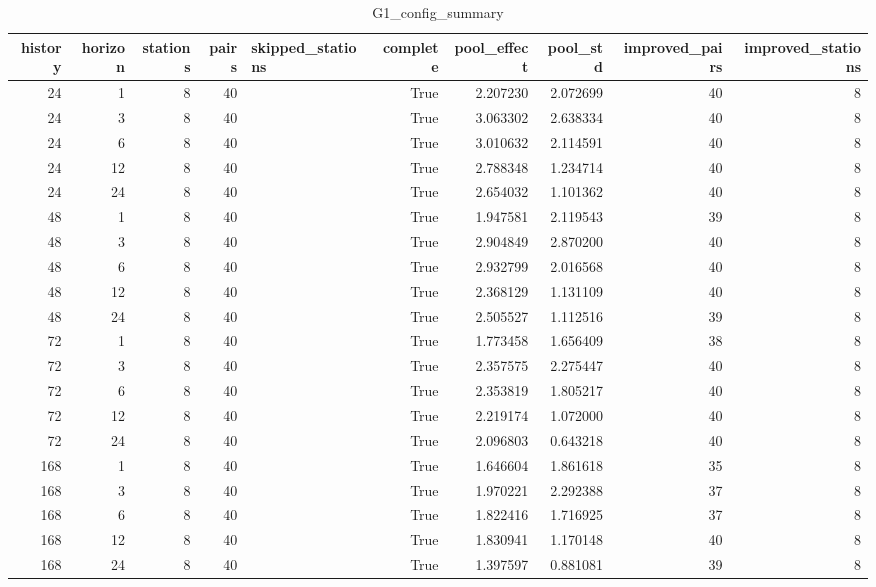 \begin{table}
\caption{G1_config_summary}
\label{tab:G1_config_summary}
\begin{tabular}{rrrrlrrrrr}
\toprule
history & horizon & stations & pairs & skipped\_stations & complete & pool\_effect & pool\_std & improved\_pairs & improved\_stations \\
\midrule
24 & 1 & 8 & 40 &  & True & 2.207230 & 2.072699 & 40 & 8 \\
24 & 3 & 8 & 40 &  & True & 3.063302 & 2.638334 & 40 & 8 \\
24 & 6 & 8 & 40 &  & True & 3.010632 & 2.114591 & 40 & 8 \\
24 & 12 & 8 & 40 &  & True & 2.788348 & 1.234714 & 40 & 8 \\
24 & 24 & 8 & 40 &  & True & 2.654032 & 1.101362 & 40 & 8 \\
48 & 1 & 8 & 40 &  & True & 1.947581 & 2.119543 & 39 & 8 \\
48 & 3 & 8 & 40 &  & True & 2.904849 & 2.870200 & 40 & 8 \\
48 & 6 & 8 & 40 &  & True & 2.932799 & 2.016568 & 40 & 8 \\
48 & 12 & 8 & 40 &  & True & 2.368129 & 1.131109 & 40 & 8 \\
48 & 24 & 8 & 40 &  & True & 2.505527 & 1.112516 & 39 & 8 \\
72 & 1 & 8 & 40 &  & True & 1.773458 & 1.656409 & 38 & 8 \\
72 & 3 & 8 & 40 &  & True & 2.357575 & 2.275447 & 40 & 8 \\
72 & 6 & 8 & 40 &  & True & 2.353819 & 1.805217 & 40 & 8 \\
72 & 12 & 8 & 40 &  & True & 2.219174 & 1.072000 & 40 & 8 \\
72 & 24 & 8 & 40 &  & True & 2.096803 & 0.643218 & 40 & 8 \\
168 & 1 & 8 & 40 &  & True & 1.646604 & 1.861618 & 35 & 8 \\
168 & 3 & 8 & 40 &  & True & 1.970221 & 2.292388 & 37 & 8 \\
168 & 6 & 8 & 40 &  & True & 1.822416 & 1.716925 & 37 & 8 \\
168 & 12 & 8 & 40 &  & True & 1.830941 & 1.170148 & 40 & 8 \\
168 & 24 & 8 & 40 &  & True & 1.397597 & 0.881081 & 39 & 8 \\
\bottomrule
\end{tabular}
\end{table}
